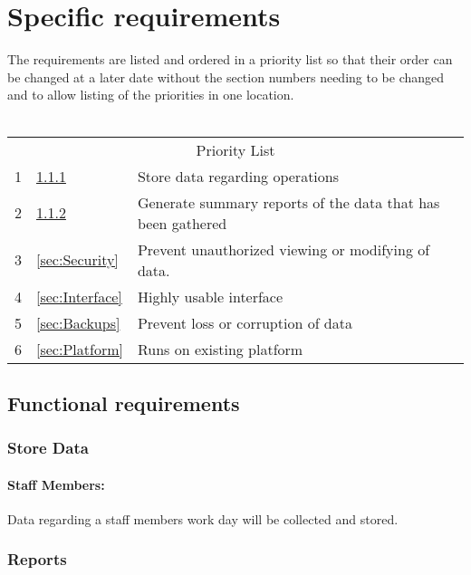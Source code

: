 \documentclass[12pt]{article}
\begin{document}
\section{Specific requirements}
The requirements are listed and ordered in a priority list so that their order can be changed at a later date without the section numbers needing to be changed and to allow listing of the priorities in one location.\\
\\
\begin{tabular}{l|lp{5.25in}}
\multicolumn{3}{c}{Priority List}\\
1 &\ref{sec:Store Data}			& Store data regarding operations \\
2 &\ref{sec:Reports}			& Generate summary reports of the data that has been gathered\\
3 &\ref{sec:Security}			& Prevent unauthorized viewing or modifying of data.\\
4 &\ref{sec:Interface}			& Highly usable interface\\ 
5 &\ref{sec:Backups}			& Prevent loss or corruption of data\\
6 &\ref{sec:Platform}			& Runs on existing platform\\
\end{tabular}
\begin{comment}
The first 2 are to be considered absolutely critical. The software cannot be considered useful if those features are absent.

What are the security implications of storing identifiable time sheet info for employees??
\end{comment}

\subsection{Functional requirements}
 
\subsubsection{Store Data}\label{sec:Store Data}
\paragraph{Staff Members:} Data regarding a staff members work day will be collected and stored.

\subsubsection{Reports}\label{sec:Reports}
\end{document}
